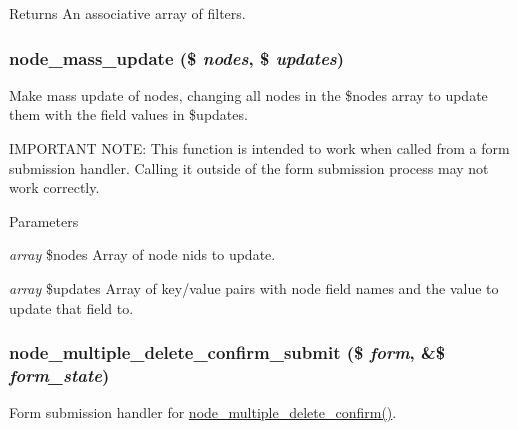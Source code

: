 \begin{DoxyReturn}{Returns}
An associative array of filters. 
\end{DoxyReturn}
\hypertarget{node_8admin_8inc_ab40a38d08f170c418b0dac544d8ba97c}{
\subsubsection[{node\_\-mass\_\-update}]{\setlength{\rightskip}{0pt plus 5cm}node\_\-mass\_\-update (\$ {\em nodes}, \/  \$ {\em updates})}}
\label{node_8admin_8inc_ab40a38d08f170c418b0dac544d8ba97c}
Make mass update of nodes, changing all nodes in the \$nodes array to update them with the field values in \$updates.

IMPORTANT NOTE: This function is intended to work when called from a form submission handler. Calling it outside of the form submission process may not work correctly.


\begin{DoxyParams}{Parameters}
\item[{\em array}]\$nodes Array of node nids to update. \item[{\em array}]\$updates Array of key/value pairs with node field names and the value to update that field to. \end{DoxyParams}
\hypertarget{node_8admin_8inc_ab8a2e11edeef2797ca739f94d1eb1af9}{
\subsubsection[{node\_\-multiple\_\-delete\_\-confirm\_\-submit}]{\setlength{\rightskip}{0pt plus 5cm}node\_\-multiple\_\-delete\_\-confirm\_\-submit (\$ {\em form}, \/  \&\$ {\em form\_\-state})}}
\label{node_8admin_8inc_ab8a2e11edeef2797ca739f94d1eb1af9}
Form submission handler for \hyperlink{group__forms_ga25cc06a5aa3aa17eadc5a8a97e7c5e9e}{node\_\-multiple\_\-delete\_\-confirm()}.

